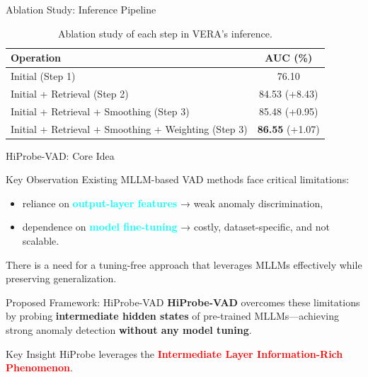 \documentclass[aspectratio=169,xcolor=dvipsnames]{beamer}
\begin{document}
	\begin{frame}{Ablation Study: Inference Pipeline}
		\small
		
		\begin{table}
			\centering
			\renewcommand{\arraystretch}{1.2}
			\setlength{\tabcolsep}{8pt}
			\begin{tabular}{l c}
				\toprule
				\textbf{Operation} & \textbf{AUC (\%)} \\
				\midrule
				Initial (Step 1) & 76.10 \\
				Initial + Retrieval (Step 2) & 84.53 \; (+8.43) \\
				Initial + Retrieval + Smoothing (Step 3) & 85.48 \; (+0.95) \\
				Initial + Retrieval + Smoothing + Weighting (Step 3) & \textbf{86.55} \; (+1.07) \\
				\bottomrule
			\end{tabular}
			\caption{Ablation study of each step in VERA's inference.}
		\end{table}
	\end{frame}
	\begin{frame}{HiProbe-VAD: Core Idea}
		\small
		
		\begin{block}{Key Observation}
			Existing MLLM-based VAD methods face critical limitations:
			\begin{itemize}
				\item reliance on \textbf{\textcolor{cyan}{output-layer features}} 
				→ weak anomaly discrimination,
				\item dependence on \textbf{\textcolor{cyan}{model fine-tuning}} 
				→ costly, dataset-specific, and not scalable.
			\end{itemize}
			There is a need for a tuning-free approach that leverages MLLMs effectively while preserving generalization.
		\end{block}
		
		\begin{alertblock}{Proposed Framework: HiProbe-VAD}
			\textbf{HiProbe-VAD} overcomes these limitations by probing \textbf{intermediate hidden states} of pre-trained MLLMs—achieving strong anomaly detection \textbf{without any model tuning}.
		\end{alertblock}
		
		\begin{block}{Key Insight}
			HiProbe leverages the \textbf{\textcolor{red}{Intermediate Layer Information-Rich Phenomenon}}.
		\end{block}
		
	\end{frame}
	
\end{document}
